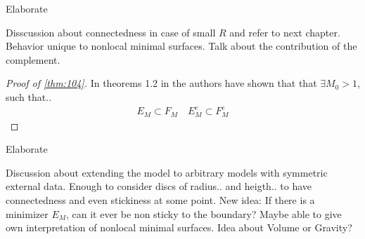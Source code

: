 \begin{TODO}
	Elaborate
\end{TODO}
Disscussion about connectedness in case of small \( R \) and refer to next chapter.
Behavior unique to nonlocal minimal surfaces.\newline
Talk about the contribution of the complement.

\begin{proof}[Proof of \cref{thm:104}]
	In theorems 1.2 in \cite{dipierro2020disconnectedness} the authors have shown that
	that \( \exists M_0 > 1 \), such that..
	\begin{gather}
		E_M \subset F_M \quad E_M^c \subset F_M^c
	\end{gather}
\end{proof}

\begin{TODO}
	Elaborate
\end{TODO}
Discussion about extending the model to arbitrary models with symmetric external data.
Enough to consider discs of radius.. and heigth.. to have connectedness and even
stickiness at some point.\newline
New idea: If there is a minimizer \( E_M \), can it ever be non sticky to the
boundary?\newline
Maybe able to give own interpretation of nonlocal minimal surfaces. Idea about Volume or
Gravity?